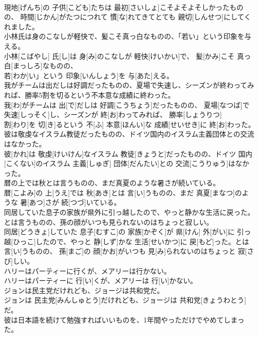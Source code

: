 \documentclass[8pt]{extreport}
\begin{document}
\begin{CJK}{UTF8}{min}
\\	現地[げんち]の 子供[こども]たちは 最初[さいしょ]こそよそよそしかったものの、 時間[じかん]がたつにつれて 慣[な]れてきてとても 親切[しんせつ]にしてくれました。
\\	小林氏は身のこなしが軽快で、髪こそ真っ白なものの、「若い」という印象を与える。	
\\	小林[こばやし] 氏[し]は 身[み]のこなしが 軽快[けいかい]で、 髪[かみ]こそ 真っ白[まっしろ]なものの、
\\	若[わか]い」という 印象[いんしょう]を 与[あた]える。
\\	我がチームは出だしは好調だったものの、夏場で失速し、シーズンが終わってみれば、勝率5割を切るという不本意な成績に終わった。	
\\	我[わ]がチームは 出[で]だしは 好調[こうちょう]だったものの、 夏場[なつば]で 失速[しっそく]し、シーズンが 終[お]わってみれば、 勝率[しょうりつ] 
\\	割[わり]を 切[き]るという 不[ふ] 本意[ほんい]な 成績[せいせき]に 終[お]わった。
\\	彼は敬虔なイスラム教徒だったものの、ドイツ国内のイスラム主義団体との交流はなかった。	
\\	彼[かれ]は 敬虔[けいけん]なイスラム 教徒[きょうと]だったものの、ドイツ 国内[こくない]のイスラム 主義[しゅぎ] 団体[だんたい]との 交流[こうりゅう]はなかった。
\\	暦の上では秋とは言うものの、まだ真夏のような暑さが続いている。	
\\	暦[こよみ]の 上[うえ]では 秋[あき]とは 言[い]うものの、まだ 真夏[まなつ]のような 暑[あつ]さが 続[つづ]いている。
\\	同居していた息子の家族が県外に引っ越したので、やっと静かな生活に戻った。とは言うものの、孫の顔がいつも見られないのはちょっと寂しい。	
\\	同居[どうきょ]していた 息子[むすこ]の 家族[かぞく]が 県[けん] 外[がい]に 引っ越[ひっこ]したので、やっと 静[しず]かな 生活[せいかつ]に 戻[もど]った。とは 言[い]うものの、 孫[まご]の 顔[かお]がいつも 見[み]られないのはちょっと 寂[さび]しい。
\\	ハリーはパーティーに行くが、メアリーは行かない。	
\\	ハリーはパーティーに 行[い]くが、メアリーは 行[い]かない。
\\	ジョンは民主党だけれども、ジョージは共和党だ。	
\\	ジョンは 民主党[みんしゅとう]だけれども、ジョージは 共和党[きょうわとう]だ。
\\	彼は日本語を続けて勉強すればいいものを、1年間やっただけでやめてしまった。	

\end{CJK}
\end{document}
